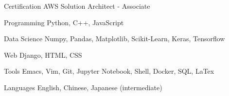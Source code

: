 


\begin{cvskills}

  
\cvskill
{Certification}
{AWS Solution Architect - Associate}


\cvskill
{Programming}
{Python, C++, JavaScript}


\cvskill
{Data Science}
{Numpy, Pandas, Matplotlib, Scikit-Learn, Keras, Tensorflow}


\cvskill
{Web}
{Django, HTML, CSS}


\cvskill
{Tools}
{Emacs, Vim, Git, Jupyter Notebook, Shell, Docker, SQL, LaTex}


\cvskill
{Languages}
{English, Chinese, Japanese (intermediate)}


\end{cvskills}